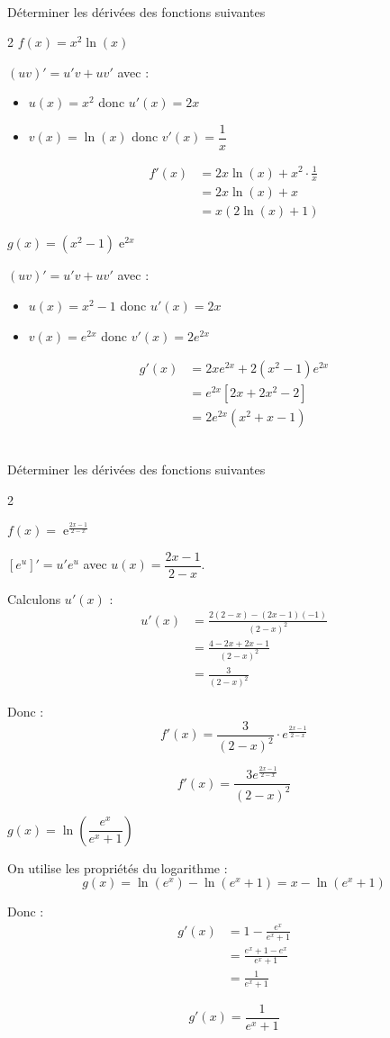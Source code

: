 \documentclass[11pt,a4paper]{article}
\DeclareMathOperator{\e}{e}
\newcommand{\cor}[1]{%
\begin{tcolorbox}[colback=red!5!white,colframe=red!75!black]
#1
\end{tcolorbox}
}
\begin{document}
\\[5 pt]
Déterminer les dérivées des fonctions suivantes
\begin{multicols}{2}
$f(x)=x^2\ln(x)$
\cor{
$(uv)' = u'v + uv'$ avec :
\begin{itemize}
\item $u(x) = x^2$ donc $u'(x) = 2x$
\item $v(x) = \ln(x)$ donc $v'(x) = \dfrac{1}{x}$
\end{itemize}

\begin{align*}
f'(x) &= 2x\ln(x) + x^2 \cdot \frac{1}{x} \\
&= 2x\ln(x) + x \\
&= x(2\ln(x) + 1)
\end{align*}

}
$g(x)= (x^2-1)\e^{2x}$
\cor{
$(uv)' = u'v + uv'$ avec :
\begin{itemize}
\item $u(x) = x^2-1$ donc $u'(x) = 2x$
\item $v(x) = e^{2x}$ donc $v'(x) = 2e^{2x}$
\end{itemize}

\begin{align*}
g'(x) &= 2xe^{2x} + 2(x^2-1)e^{2x} \\
&= e^{2x}[2x + 2x^2 - 2] \\
&= 2e^{2x}(x^2 + x - 1)
\end{align*}
}


\end{multicols}

\\[5 pt]
Déterminer les dérivées des fonctions suivantes
\begin{multicols}{2}

$f(x)=\e^{\frac{2x-1}{2-x}}$
\cor{
$[e^u]' = u'e^u$ avec $u(x) = \dfrac{2x-1}{2-x}$.

Calculons $u'(x)$ :
\begin{align*}
u'(x) &= \frac{2(2-x) - (2x-1)(-1)}{(2-x)^2} \\
&= \frac{4 - 2x + 2x - 1}{(2-x)^2} \\
&= \frac{3}{(2-x)^2}
\end{align*}

Donc :
$$f'(x) = \frac{3}{(2-x)^2} \cdot e^{\frac{2x-1}{2-x}}$$

$$\boxed{f'(x) = \frac{3e^{\frac{2x-1}{2-x}}}{(2-x)^2}}$$
}

\columnbreak 


$g(x)= \ln\left(\dfrac{e^x}{e^x+1}\right)$
\cor{
On utilise les propriétés du logarithme :
$$g(x) = \ln(e^x) - \ln(e^x+1) = x - \ln(e^x+1)$$

Donc :
\begin{align*}
g'(x) &= 1 - \frac{e^x}{e^x+1} \\
&= \frac{e^x+1 - e^x}{e^x+1} \\
&= \frac{1}{e^x+1}
\end{align*}

$$\boxed{g'(x) = \frac{1}{e^x+1}}$$
}


\end{multicols}
\end{document}
